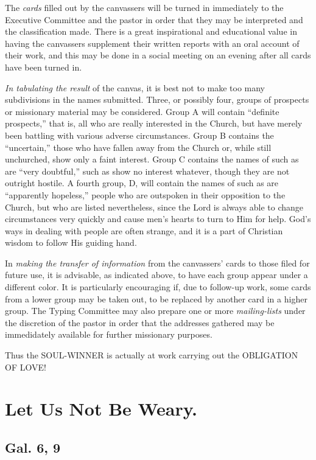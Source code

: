 \documentclass[
]{book}
\begin{document}
The \emph{cards} filled out by the canvassers will be turned in immediately to the Executive Committee and the pastor in order that they may be interpreted and the classification made. There is a great inspirational and educational value in having the canvassers supplement their written reports with an oral account of their work, and this may be done in a social meeting on an evening after all cards have been turned in.

\emph{In tabulating the result} of the canvas, it is best not to make too many subdivisions in the names submitted. Three, or possibly four, groups of prospects or missionary material may be considered. Group A will contain ``definite prospects,'' that is, all who are really interested in the Church, but have merely been battling with various adverse circumstances. Group B contains the ``uncertain,'' those who have fallen away from the Church or, while still unchurched, show only a faint interest. Group C contains the names of such as are ``very doubtful,'' such as show no interest whatever, though they are not outright hostile. A fourth group, D, will contain the names of such as are ``apparently hopeless,'' people who are outspoken in their opposition to the Church, but who are listed nevertheless, since the Lord is always able to change circumstances very quickly and cause men's hearts to turn to Him for help. God's ways in dealing with people are often strange, and it is a part of Christian wisdom to follow His guiding hand.

In \emph{making the transfer of information} from the canvassers' cards to those filed for future use, it is advisable, as indicated above, to have each group appear under a different color. It is particularly encouraging if, due to follow-up work, some cards from a lower group may be taken out, to be replaced by another card in a higher group. The Typing Committee may also prepare one or more \emph{mailing-lists} under the discretion of the pastor in order that the addresses gathered may be immedidately available for further missionary purposes.

Thus the SOUL-WINNER is actually at work carrying out the OBLIGATION OF LOVE!

\hypertarget{let-us-not-be-weary.}{%
\chapter{Let Us Not Be Weary.}\label{let-us-not-be-weary.}}

\hypertarget{gal.-6-9}{%
\section*{Gal. 6, 9}\label{gal.-6-9}}
\end{document}
